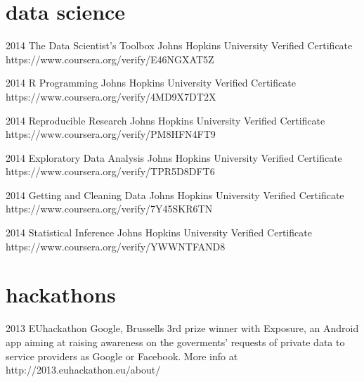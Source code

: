 \documentclass[]{friggeri-cv} %
\begin{document}
\section{data science}
\begin{entrylist}
\entry
{2014}
{The Data Scientist’s Toolbox}
{Johns Hopkins University}
{Verified Certificate https://www.coursera.org/verify/E46NGXAT5Z}

\entry
{2014}
{R Programming}
{Johns Hopkins University}
{Verified Certificate https://www.coursera.org/verify/4MD9X7DT2X}

\entry
{2014}
{Reproducible Research}
{Johns Hopkins University}
{Verified Certificate https://www.coursera.org/verify/PM8HFN4FT9}

\entry
{2014}
{Exploratory Data Analysis}
{Johns Hopkins University}
{Verified Certificate https://www.coursera.org/verify/TPR5D8DFT6}

\entry
{2014}
{Getting and Cleaning Data}
{Johns Hopkins University}
{Verified Certificate https://www.coursera.org/verify/7Y45SKR6TN}

\entry
{2014}
{Statistical Inference}
{Johns Hopkins University}
{Verified Certificate https://www.coursera.org/verify/YWWNTFAND8}
\end{entrylist}

\section{hackathons}
\begin{entrylist}
\entry
{2013}
{EUhackathon}
{Google, Brussells}
{3rd prize winner with Exposure, an Android app aiming at raising awareness on the goverments' requests
of private data to service providers as Google or Facebook. More info at http://2013.euhackathon.eu/about/}

\end{entrylist}

\end{document}
